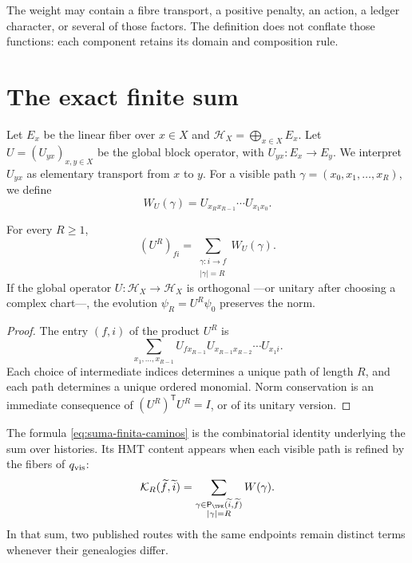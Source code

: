 The weight may contain a fibre transport, a positive penalty, an
action, a ledger character, or several of those factors. The definition does not
conflate those functions: each component retains its domain and composition
rule.

\section{The exact finite sum}

Let \(E_x\) be the linear fiber over \(x\in X\) and
\(\mathcal H_X=\bigoplus_{x\in X}E_x\). Let
\(U=(U_{yx})_{x,y\in X}\) be the global block operator, with
\(U_{yx}:E_x\to E_y\). We interpret \(U_{yx}\) as elementary transport
from \(x\) to \(y\). For a visible path
\(\gamma=(x_0,x_1,\ldots,x_R)\), we define
\[
 W_U(\gamma)=U_{x_Rx_{R-1}}\cdots U_{x_1x_0}.
\]

\begin{theorem}
\label{thm:suma-finita-caminos}
For every \(R\geq 1\),
\begin{equation}
 (U^R)_{fi}
 =\sum_{\substack{\gamma:i\to f\\|\gamma|=R}}W_U(\gamma).
 \label{eq:suma-finita-caminos}
\end{equation}
If the global operator \(U:\mathcal H_X\to\mathcal H_X\) is orthogonal ---or
unitary after choosing a complex chart---, the
evolution \(\psi_R=U^R\psi_0\) preserves the norm.
\end{theorem}

\begin{proof}
The entry \((f,i)\) of the product \(U^R\) is
\[
 \sum_{x_1,\ldots,x_{R-1}}
 U_{fx_{R-1}}U_{x_{R-1}x_{R-2}}\cdots U_{x_1i}.
\]
Each choice of intermediate indices determines a unique path of length
\(R\), and each path determines a unique ordered monomial. Norm
conservation is an immediate consequence of \((U^R)^{\mathsf T}U^R=I\), or of its
unitary version.
\end{proof}

The formula \eqref{eq:suma-finita-caminos} is the combinatorial identity
underlying the sum over histories. Its HMT content appears when each
visible path is refined by the fibers of \(q_{\rm vis}\):
\begin{equation}
 \mathcal K_R(\widetilde f,\widetilde i)
 =\sum_{\substack{\gamma\in
        \mathsf P_{\TPK}(\widetilde i,\widetilde f)\\|\gamma|=R}}
 W(\gamma).
 \label{eq:kernel-genealogico-finito}
\end{equation}
In that sum, two published routes with the same endpoints remain distinct
terms whenever their genealogies differ.

